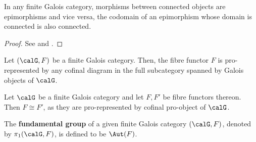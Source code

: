             \begin{lemma} \label{lemma: morphisms_between_connected_objects_are_epic}
                In any finite Galois category, morphisms between connected objects are epimorphisms and vice versa, the codomain of an epimorphism whose domain is connected is also connected.
            \end{lemma}
                \begin{proof}
                    See \cite[\href{https://stacks.math.columbia.edu/tag/0BN0}{Tag 0BN0}]{stacks} and \cite[Proposition 3.5]{nlab:connected_objects}.
                \end{proof}
            \begin{proposition} \label{prop: fibre_functors_of_finite_galois_categories_are_pro_represented_by_galois_objects}
                \cite[\href{https://stacks.math.columbia.edu/tag/0BN3}{Tag 0BN3}]{stacks} Let $(\calG, F)$ be a finite Galois category. Then, the fibre functor $F$ is pro-represented by any cofinal diagram in the full subcategory spanned by Galois objects of $\calG$.
            \end{proposition}
            \begin{corollary} \label{coro: only_one_fibre_functor_on_a_finite_galois_category}
                Let $\calG$ be a finite Galois category and let $F, F'$ be fibre functors thereon. Then $F \cong F'$, as they are pro-represented by cofinal pro-object of $\calG$.
            \end{corollary}
            
            \begin{definition} \label{def: fundamental_groups_of_finite_galois_categories}
                The \textbf{fundamental group} of a given finite Galois category $(\calG, F)$, denoted by $\pi_1(\calG, F)$, is defined to be $\Aut(F)$.
            \end{definition}
            
